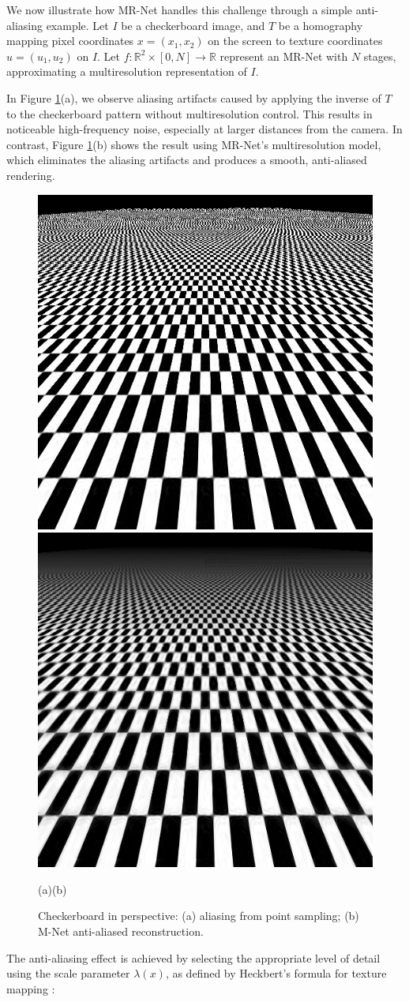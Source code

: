 We now illustrate how MR-Net handles this challenge through a simple anti-aliasing example. Let \(I\) be a checkerboard image, and \(T\) be a homography mapping pixel coordinates \(x = (x_1, x_2)\) on the screen to texture coordinates \(u = (u_1, u_2)\) on \(I\). Let \(f: \mathbb{R}^2 \times [0, N] \to \mathbb{R}\) represent an MR-Net with \(N\) stages, approximating a multiresolution representation of \(I\).

In Figure \ref{f:alias}(a), we observe aliasing artifacts caused by applying the inverse of \(T\) to the checkerboard pattern without multiresolution control. This results in noticeable high-frequency noise, especially at larger distances from the camera. In contrast, Figure \ref{f:alias}(b) shows the result using MR-Net's multiresolution model, which eliminates the aliasing artifacts and produces a smooth, anti-aliased rendering.

\begin{figure}[!h]
\centering
\includegraphics[width=0.46\linewidth]{img/ch5/im_0_alias.png}
\includegraphics[width=0.46\linewidth]{img/ch5/im_0_anti_alias.png}
\centerline{(a)\hfil\hfil(b)}
\caption{Checkerboard in perspective: (a) aliasing from point sampling; (b) M-Net anti-aliased reconstruction.}
\label{f:alias}
\end{figure}


The anti-aliasing effect is achieved by selecting the appropriate level of detail using the scale parameter \(\lambda(x)\), as defined by Heckbert's formula for texture mapping \cite{heckbert1983texture}:

